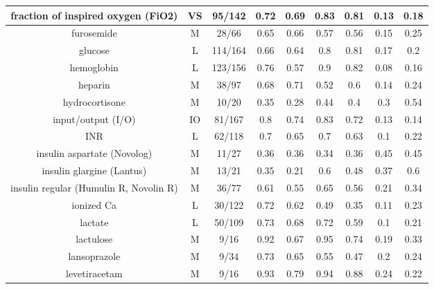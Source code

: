 \begin{scriptsize}
\begin{center}
\begin{longtable}{|ccc|c|c|c|c|c|c|}
\midrule
\multicolumn{1}{|c|}{fraction of inspired oxygen (FiO2)} & \multicolumn{1}{c|}{VS} & 95/142 & 0.72  & 0.69  & 0.83  & 0.81  & 0.13  & 0.18 \\
\midrule
\multicolumn{1}{|c|}{furosemide} & \multicolumn{1}{c|}{M} & 28/66 & 0.65  & 0.66  & 0.57  & 0.56  & 0.15  & 0.25 \\
\midrule
\multicolumn{1}{|c|}{glucose} & \multicolumn{1}{c|}{L} & 114/164 & 0.66  & 0.64  & 0.8   & 0.81  & 0.17  & 0.2 \\
\midrule
\multicolumn{1}{|c|}{hemoglobin} & \multicolumn{1}{c|}{L} & 123/156 & 0.76  & 0.57  & 0.9   & 0.82  & 0.08  & 0.16 \\
\midrule
\multicolumn{1}{|c|}{heparin} & \multicolumn{1}{c|}{M} & 38/97 & 0.68  & 0.71  & 0.52  & 0.6   & 0.14  & 0.24 \\
\midrule
\multicolumn{1}{|c|}{hydrocortisone} & \multicolumn{1}{c|}{M} & 10/20 & 0.35  & 0.28  & 0.44  & 0.4   & 0.3   & 0.54 \\
\midrule
\multicolumn{1}{|c|}{input/output (I/O)} & \multicolumn{1}{c|}{IO} & 81/167 & 0.8   & 0.74  & 0.83  & 0.72  & 0.13  & 0.14 \\
\midrule
\multicolumn{1}{|c|}{INR} & \multicolumn{1}{c|}{L} & 62/118 & 0.7   & 0.65  & 0.7   & 0.63  & 0.1   & 0.22 \\
\midrule
\multicolumn{1}{|c|}{insulin aspartate (Novolog)} & \multicolumn{1}{c|}{M} & 11/27 & 0.36  & 0.36  & 0.34  & 0.36  & 0.45  & 0.45 \\
\midrule
\multicolumn{1}{|c|}{insulin glargine (Lantus)} & \multicolumn{1}{c|}{M} & 13/21 & 0.35  & 0.21  & 0.6   & 0.48  & 0.37  & 0.6 \\
\midrule
\multicolumn{1}{|c|}{insulin regular (Humulin R, Novolin R)} & \multicolumn{1}{c|}{M} & 36/77 & 0.61  & 0.55  & 0.65  & 0.56  & 0.21  & 0.34 \\
\midrule
\multicolumn{1}{|c|}{ionized Ca} & \multicolumn{1}{c|}{L} & 30/122 & 0.72  & 0.62  & 0.49  & 0.35  & 0.11  & 0.23 \\
\midrule
\multicolumn{1}{|c|}{lactate} & \multicolumn{1}{c|}{L} & 50/109 & 0.73  & 0.68  & 0.72  & 0.59  & 0.1   & 0.21 \\
\midrule
\multicolumn{1}{|c|}{lactulose} & \multicolumn{1}{c|}{M} & 9/16 & 0.92  & 0.67  & 0.95  & 0.74  & 0.19  & 0.33 \\
\midrule
\multicolumn{1}{|c|}{lansoprazole} & \multicolumn{1}{c|}{M} & 9/34 & 0.73  & 0.65  & 0.55  & 0.47  & 0.2   & 0.24 \\
\midrule
\multicolumn{1}{|c|}{levetiracetam} & \multicolumn{1}{c|}{M} & 9/16 & 0.93  & 0.79  & 0.94  & 0.88  & 0.24  & 0.22 \\

\end{longtable}
\end{center}
\end{scriptsize}
